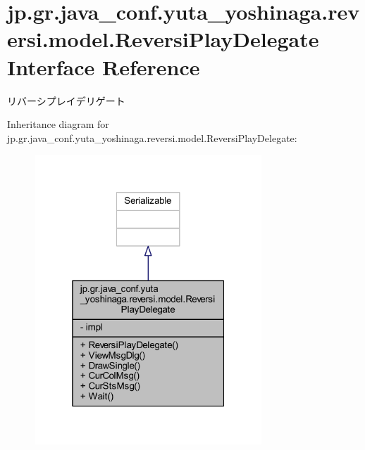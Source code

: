 \hypertarget{classjp_1_1gr_1_1java__conf_1_1yuta__yoshinaga_1_1reversi_1_1model_1_1_reversi_play_delegate}{}\section{jp.\+gr.\+java\+\_\+conf.\+yuta\+\_\+yoshinaga.\+reversi.\+model.\+Reversi\+Play\+Delegate Interface Reference}
\label{classjp_1_1gr_1_1java__conf_1_1yuta__yoshinaga_1_1reversi_1_1model_1_1_reversi_play_delegate}


リバーシプレイデリゲート  




Inheritance diagram for jp.\+gr.\+java\+\_\+conf.\+yuta\+\_\+yoshinaga.\+reversi.\+model.\+Reversi\+Play\+Delegate\+:\nopagebreak
\begin{figure}[H]
\begin{center}
\leavevmode
\includegraphics[width=241pt]{classjp_1_1gr_1_1java__conf_1_1yuta__yoshinaga_1_1reversi_1_1model_1_1_reversi_play_delegate__inherit__graph}
\end{center}
\end{figure}


